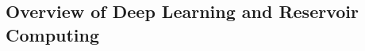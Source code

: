 \subsection{\label{sec:overview_of_deep_learning_and_reservoir_computing}Overview of Deep Learning and Reservoir Computing}


\cite{jaha2004}
